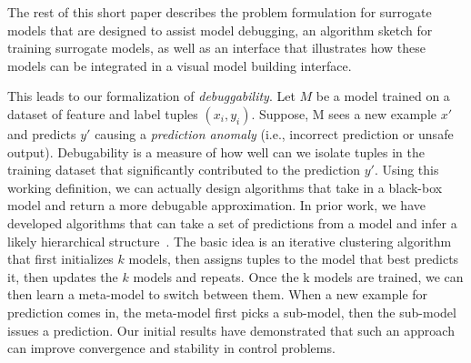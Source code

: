 The rest of this short paper describes the problem formulation for surrogate models that are designed to assist model debugging, an algorithm sketch for training surrogate models, as well as an interface that illustrates how these models can be integrated in a visual model building interface.


This leads to our formalization of \emph{debuggability}.
Let $M$ be a model trained on a dataset of feature and label tuples $(x_i,y_i)$.
Suppose, M sees a new example $x'$ and predicts $y'$ causing a \emph{prediction anomaly} (i.e., incorrect prediction or unsafe output).
Debugability is a measure of how well can we isolate tuples in the training dataset that significantly contributed to the prediction $y'$.
Using this working definition, we can actually design algorithms that take in a black-box model and return a more debugable approximation.
In prior work, we have developed algorithms that can take a set of predictions from a model and infer a likely hierarchical structure~\cite{DBLP:journals/corr/KrishnanGLMPG16, Krishnan17}.
The basic idea is an iterative clustering algorithm that first initializes $k$ models, then assigns tuples to the model that best predicts it, then updates the $k$ models and repeats.
Once the k models are trained, we can then learn a meta-model to switch between them.
When a new example for prediction comes in, the meta-model first picks a sub-model, then the sub-model issues a prediction.
Our initial results have demonstrated that such an approach can improve convergence and stability in control problems.
\fi




























